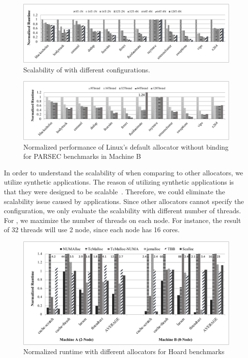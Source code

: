 \begin{figure}[H]
    \centering
    \includegraphics[width=\textwidth]{figure/scalobility-numalloc.pdf}
    \caption{Scalability of \NM{} with different configurations.\label{fig: numalloc-scalability}}
\end{figure}

\begin{figure}[!h]
    \centering
    \includegraphics[width=\textwidth]{figure/scalability-pthread.pdf}
    \caption{Normalized performance of Linux's default allocator without binding for PARSEC benchmarks in Machine B}
    \label{pthread-scalibity}
\end{figure}

 In order to understand the scalability of \NM{} when comparing to other allocators, we utilize synthetic applications. The reason of utilizing synthetic applications is that they were designed to be scalable~\cite{Scalloc}. Therefore, we could eliminate the scalability issue caused by applications. Since other allocators cannot specify the configuration, we only evaluate the scalability with different number of threads. For \NM{}, we maximize the number of threads on each node. For instance, the result of 32 threads will use 2 node, since each node has 16 cores.  


\begin{figure}[!ht]
    \centering
    \includegraphics[width=\textwidth]{figure/hoard-perf.pdf}
    \caption{Normalized runtime with different allocators for Hoard benchmarks}
    \label{hoard-perf}
\end{figure}


